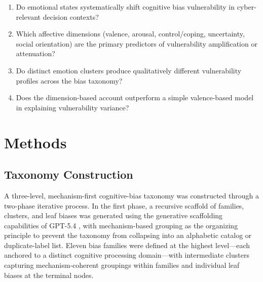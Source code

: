 \documentclass[12pt,a4paper]{article}
\begin{document}
\begin{enumerate}[label=RQ\arabic*.,leftmargin=2.8em]
  \item Do emotional states systematically shift cognitive bias vulnerability in cyber-relevant decision contexts?
  \item Which affective dimensions (valence, arousal, control/coping, uncertainty, social orientation) are the primary predictors of vulnerability amplification or attenuation?
  \item Do distinct emotion clusters produce qualitatively different vulnerability profiles across the bias taxonomy?
  \item Does the dimension-based account outperform a simple valence-based model in explaining vulnerability variance?
\end{enumerate}

\section{Methods}

\subsection{Taxonomy Construction}

A three-level, mechanism-first cognitive-bias taxonomy was constructed through a two-phase iterative process. In the first phase, a recursive scaffold of families, clusters, and leaf biases was generated using the generative scaffolding capabilities of GPT-5.4 \citep{openai2025gpt54}, with mechanism-based grouping as the organizing principle to prevent the taxonomy from collapsing into an alphabetic catalog or duplicate-label list. Eleven bias families were defined at the highest level---each anchored to a distinct cognitive processing domain---with intermediate clusters capturing mechanism-coherent groupings within families and individual leaf biases at the terminal nodes.
\end{document}
